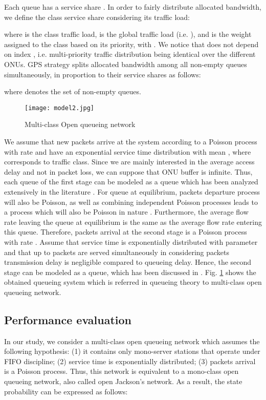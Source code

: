 \documentclass[a4paper,10pt]{IEEEtran}
\begin{document}
Each queue has a service share . In order to fairly
distribute allocated bandwidth, we define the class service share
considering its traffic load:

where  is the class  traffic load,  is the
global traffic load (i.e. ), and
 is the weight assigned to the class  based on its
priority, with . We notice that
 does not depend on index , i.e. multi-priority
traffic distribution being identical over the different ONUs. GPS
strategy splits allocated bandwidth among all non-empty queues
simultaneously, in proportion to their service shares as follows:

where  denotes the set of non-empty queues.
\begin{figure}[!h]
\centering
\texttt{[image: model2.jpg]}
\caption{Multi-class Open queueing network} \label{onu-model2}
\end{figure}

We assume that new packets arrive at the system according to a
Poisson process with rate  and have an exponential
service time distribution with mean , where 
corresponds to traffic class. Since we are mainly interested in the
average access delay and not in packet loss, we can suppose that ONU
buffer is infinite. Thus, each queue of the first stage can be
modeled as a  queue which has been analyzed extensively in
the literature \cite{Baynat:2000, Pujolle:1989}. For  queue
at equilibrium, packets departure process will also be Poisson, as
well as combining independent Poisson processes leads to a process
which will also be Poisson in nature \cite{Baynat:2000}.
Furthermore, the average flow rate leaving the  queue at
equilibrium is the same as the average flow rate entering this
queue. Therefore, packets arrival at the second stage is a Poisson
process with rate . Assume that service time is
exponentially distributed with parameter
 and that up to 
packets are served simultaneously in considering packets
transmission delay is negligible compared to queueing delay. Hence,
the second stage can be modeled as a  queue, which has
been discussed in \cite{Pujolle:1989}. Fig. \ref{onu-model2} shows
the obtained queueing system which is referred in queueing theory to
multi-class open queueing network.
\subsection{Performance evaluation}
In our study, we consider a multi-class open queueing network which
assumes the following hypothesis: (1) it contains only mono-server
stations that operate under FIFO discipline; (2) service time is
exponentially distributed; (3) packets arrival is a Poisson process.
Thus, this network is equivalent to a mono-class open queueing
network, also called open Jackson's network. As a result, the state
probability can be expressed as follows:
\end{document}
